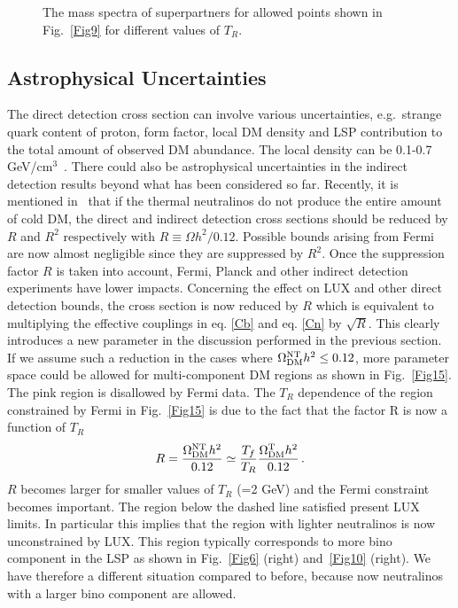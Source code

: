 \documentclass[12pt,a4paper]{book}
\begin{document}
\begin{figure}
\centering
{} \quad
{} 
\caption{The mass spectra of superpartners for allowed points shown in Fig.~\ref{Fig9} for different values of $T_R$.}
\label{Fig7a}
\end{figure}

\subsection{Astrophysical Uncertainties}

The direct detection cross section can involve various uncertainties, e.g.~strange quark content of proton, form factor, local DM density and LSP contribution to the total amount of observed DM abundance. The local density can be 0.1-0.7 GeV/cm$^3$~\cite{Read:2014qva}. There could also be astrophysical uncertainties in the indirect detection results beyond what has been considered so far. Recently, it is  mentioned in~\cite{Baer:2015tva, Cahill-Rowley:2013dpa} that if the thermal neutralinos do not produce the entire amount of cold DM, the  direct and indirect detection cross sections should be reduced by $R$ and $R^2$ respectively with $R\equiv \Omega h^2/0.12$. Possible bounds arising from Fermi are now almost negligible since they are suppressed by $R^2$. Once the suppression factor $R$ is taken into account, Fermi, Planck and other indirect detection experiments have lower impacts. Concerning the effect on LUX and other direct detection bounds, the cross section is now reduced by $R$ which is equivalent to multiplying the effective couplings in eq. \eqref{Cb} and eq. \eqref{Cn} by $\sqrt{R}$. This clearly introduces a new parameter in the discussion performed in the previous section.\\

If we assume such a reduction in the cases where $\Omega^{\rm NT}_{\rm DM} h^2\le 0.12$, more parameter space could be allowed for multi-component DM regions as shown in Fig.~\ref{Fig15}. The pink region is disallowed by Fermi data. The $T_R$ dependence of the region constrained by Fermi in Fig.~\ref{Fig15} is due to the fact that the  factor R is now a function of $T_R$
\begin{align}
R = \frac{\Omega^{\rm NT}_{\rm DM} h^2}{0.12} \simeq \frac{T_f}{T_R} \frac{\Omega^{\rm T}_{\rm DM} h^2}{0.12}\,.
\end{align}
$R$ becomes larger for smaller values of $T_R$ (=2 GeV) and the Fermi constraint becomes important. The region below the dashed line satisfied present LUX limits. In particular this implies that the region with lighter neutralinos is now unconstrained by LUX. This region typically corresponds to more bino component in the LSP as shown in Fig.~\ref{Fig6} (right) and~\ref{Fig10} (right). We have therefore a different situation compared to before, because now neutralinos with a larger bino component are allowed.\\
\end{document}
